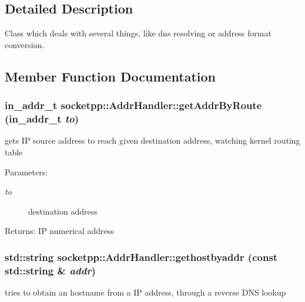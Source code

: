 \subsection{Detailed Description}
Class which deals with several things, like dns resolving or address format conversion. 

\subsection{Member Function Documentation}
\hypertarget{classsocketpp_1_1AddrHandler_79db1454cc9c12bbd44b526f61ff84fb}{
\subsubsection[{getAddrByRoute}]{\setlength{\rightskip}{0pt plus 5cm}in\_\-addr\_\-t socketpp::AddrHandler::getAddrByRoute (in\_\-addr\_\-t {\em to})}}
\label{classsocketpp_1_1AddrHandler_79db1454cc9c12bbd44b526f61ff84fb}


gets IP source address to reach given destination address, watching kernel routing table 

\begin{Desc}
\item[Parameters:]
\begin{description}
\item[{\em to}]destination address \end{description}
\end{Desc}
\begin{Desc}
\item[Returns:]IP numerical address \end{Desc}
\hypertarget{classsocketpp_1_1AddrHandler_2e9b9e6dc7ea4fc4a3500665b3f4062d}{
\subsubsection[{gethostbyaddr}]{\setlength{\rightskip}{0pt plus 5cm}std::string socketpp::AddrHandler::gethostbyaddr (const std::string \& {\em addr})}}
\label{classsocketpp_1_1AddrHandler_2e9b9e6dc7ea4fc4a3500665b3f4062d}


tries to obtain an hostname from a IP address, through a reverse DNS lookup 

